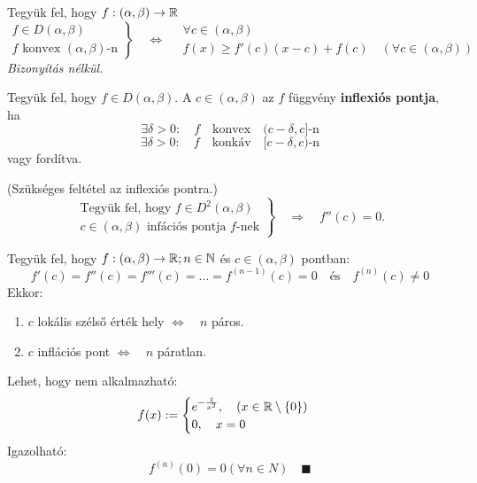 \documentclass[a4paper,11.5pt]{article}
\begin{document}
	\begin{theorem}
		Tegyük fel, hogy $f:(\alpha,\beta)\to\mathbb{R}$
		\[ \left.\begin{gathered}
		f\in D(\alpha,\beta)\\
		f\text{ konvex } (\alpha,\beta)\text{-n}
		\end{gathered}\right\}\quad \Leftrightarrow\quad \begin{gathered}
		\forall c\in(\alpha,\beta)\\
		f(x)\geq f'(c)(x-c)+f(c)\quad (\forall c\in(\alpha,\beta))
		\end{gathered} \]
		\textit{Bizonyítás nélkül.}
	\end{theorem}
	\begin{definition}
		Tegyük fel, hogy $f\in D(\alpha,\beta).$ A $c\in(\alpha,\beta)$ az $f$ függvény \textbf{inflexiós pontja}, ha
		\[ \exists\delta>0:\quad f\quad  \text{konvex}\quad (c-\delta,c]\text{-n} \]
		\[ \exists\delta>0:\quad f\quad  \text{konkáv}\quad [c-\delta,c)\text{-n} \]
		vagy fordítva.
	\end{definition}
	\begin{theorem}
		(Szükséges feltétel az inflexiós pontra.)
		\[\left.
		\begin{gathered}
		\text{Tegyük fel, hogy } f\in D^2(\alpha,\beta)\\
		c\in(\alpha,\beta)\text{ infációs pontja $f$-nek}
		\end{gathered}\right\}\quad \Rightarrow\quad f''(c)=0.
		\]
	\end{theorem}
	\begin{theorem}
		Tegyük fel, hogy $f:(\alpha,\beta)\to\mathbb{R}; n\in\mathbb{N} $ és $c\in (\alpha,\beta)$ pontban:
		\[ f'(c)=f''(c)=f'''(c)=\ldots=f^{(n-1)}(c)=0\quad \text{és}\quad f^{(n)}(c)\not=0 \]
		Ekkor:
		\begin{enumerate}
			\item $c$ lokális szélső érték hely \quad $\Leftrightarrow\quad n$ páros.
			\item $c$ inflációs pont \quad $\Leftrightarrow\quad n$ páratlan.
		\end{enumerate}
	\end{theorem}
	\begin{note}
		Lehet, hogy nem alkalmazható:
		\[ f(x):=\begin{cases}
		e^{-\frac{1}{x^2}},\quad (x\in \mathbb{R}\setminus\{0\})\\
		0,\quad x=0
		\end{cases} \]
		Igazolható:
		\[ f^{(n)}(0)=0(\forall n\in N)\quad \blacksquare \]
	\end{note}
\end{document}
